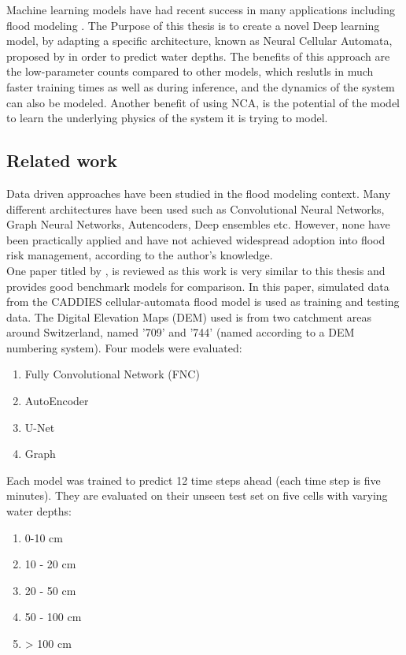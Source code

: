 Machine learning models have had recent success in many applications including flood modeling \cite{russo2023evaluation, karim2023review, chaudhary2022flood}. The Purpose of this thesis is to create a novel Deep learning model, by adapting a specific architecture, known as Neural Cellular Automata, proposed by \citeauthor{growing_nca} \cite{growing_nca} in order to predict water depths. The benefits of this approach are the low-parameter counts compared to other models, which reslutls in much faster training times as well as during inference, and the dynamics of the system can also be modeled. Another benefit of using NCA, is the potential of the model to learn the underlying physics of the system it is trying to model.

\subsection{Related work}
Data driven approaches have been studied in the flood modeling context. Many different architectures have been used such as Convolutional Neural Networks, Graph Neural Networks, Autencoders, Deep ensembles etc. However, none have been practically applied and have not achieved widespread adoption into flood risk management, according to the author's knowledge. \\

One paper titled  by  \citeauthor{russo2023evaluation} \cite{russo2023evaluation}, is reviewed as this work is very similar to this thesis and provides good benchmark models for comparison. In this paper, simulated data from the CADDIES cellular-automata flood model is used as training and testing data. The Digital Elevation Maps (DEM) used is from two catchment areas around Switzerland, named '709' and '744' (named according to a DEM numbering system). Four models were evaluated:
\begin{enumerate}
	\item Fully Convolutional Network (FNC)
	\item AutoEncoder
	\item U-Net
	\item Graph
\end{enumerate}

Each model was trained to predict 12 time steps ahead (each time step is five minutes). They are evaluated on their unseen test set on five cells with varying water depths:
\begin{enumerate}
	\item 0-10 cm
	\item 10 - 20 cm
	\item 20 - 50 cm
	\item 50 - 100 cm
	\item > 100 cm
\end{enumerate} 

